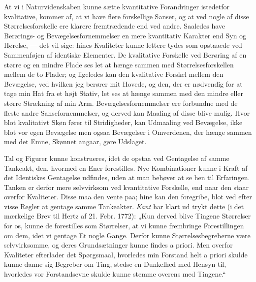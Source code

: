 \documentclass[12pt,a4paper]{book}
\newcommand{\opage}[1]{\marginnote{\footnotesize\textit{[#1]}}}
\begin{document}
At vi i Naturvidenskaben kunne sætte kvantitative Forandringer istedetfor
kvalitative, kommer af, at vi have flere forskellige Sanser, og at ved nogle af
disse Størrelsesforskelle ere klarere fremtrædende end ved andre. Saaledes have
Berørings- og Bevægelsesfornemmelser en mere kvantitativ Karakter end Syn og
Hørelse, --- det vil sige: hines Kvaliteter kunne lettere tydes som opstaaede ved
Sammenføjen af identiske Elementer. De kvalitative Forskelle ved Berøring af en
større og en mindre Flade ses let at hænge sammen med Størrelsesforskellen mellem
de to Flader; og ligeledes kan den kvalitative Forskel mellem den Bevægelse, ved
hvilken jeg berører mit Hovede, og den, der er nødvendig for at tage min Hat fra et
højt Stativ, let ses at hænge sammen med den mindre eller større Strækning af min
Arm. Bevægelsesfornemmelser ere forbundne med de fleste andre Sansefornemmelser, og
derved kan Maaling af disse blive mulig. Hvor blot kvalitativt Skøn fører til
Stridigheder, kan Udmaaling ved Bevægelse, ikke blot vor egen Bevægelse men ogsaa
Bevægelser i Omverdenen, der hænge sammen med det Emne, Skønnet angaar, gøre
Udslaget.

Tal og Figurer kunne konstrueres, idet de opstaa ved Gentagelse af samme Tankeakt,
den, hvormed en Ener forestilles. Nye Kombinationer kunne i Kraft af det Identiskes
Gentagelse udfindes, uden at man behøver at se hen til Erfaringen. Tanken er derfor
mere selvvirksom ved kvantitative Forskelle, end naar den staar overfor Kvaliteter.
Disse maa den vente paa; hine kan den foregribe, blot ved efter visse Regler at
gentage samme Tankeakter. \emph{Kant} har klart ud%
\opage{276}trykt dette (i det mærkelige Brev
til Hertz af 21. Febr. 1772): „Kun derved blive Tingene Størrelser for os, kunne de
forestilles som Størrelser, at vi kunne frembringe Forestillingen om dem, idet vi
gentage Et nogle Gange. Derfor kunne Størrelsesbegreberne være selvvirksomme, og
deres Grundsætninger kunne findes a priori. Men overfor Kvaliteter efterlader det
Spørgsmaal, hvorledes min Forstand helt a priori skulde kunne danne sig Begreber om
Ting, stedse en Dunkelhed med Hensyn til, hvorledes vor Forstandsevne skulde kunne
stemme overens med Tingene.“
\end{document}
